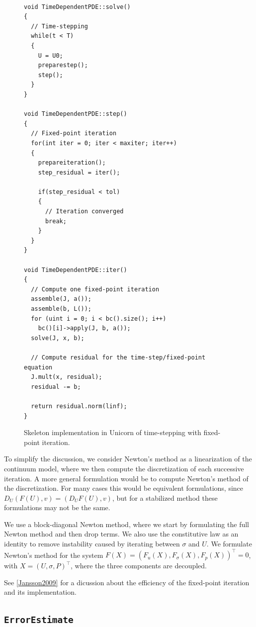 \begin{figure}[!h]
{\small
\begin{lstlisting}

void TimeDependentPDE::solve()
{
  // Time-stepping
  while(t < T)
  {
    U = U0;
    preparestep();
    step();
  }
}

void TimeDependentPDE::step()
{
  // Fixed-point iteration
  for(int iter = 0; iter < maxiter; iter++)
  {
    prepareiteration();
    step_residual = iter();

    if(step_residual < tol)
    {
      // Iteration converged
      break;
    }
  }
}

void TimeDependentPDE::iter()
{
  // Compute one fixed-point iteration
  assemble(J, a());
  assemble(b, L());
  for (uint i = 0; i < bc().size(); i++)
    bc()[i]->apply(J, b, a());
  solve(J, x, b);

  // Compute residual for the time-step/fixed-point equation
  J.mult(x, residual);
  residual -= b;

  return residual.norm(linf);
}
\end{lstlisting}
}
\label{code:time-stepping}
\caption{
Skeleton implementation in Unicorn of time-stepping with fixed-point
iteration.}
\end{figure}

To simplify the discussion, we consider Newton's method as a
linearization of the continuum model, where we then compute the
discretization of each successive iteration. A more general
formulation would be to compute Newton's method of the
discretization. For many cases this would be equivalent formulations,
since $D_U (F(U), v) = (D_U F(U), v)$, but for a stabilized method
these formulations may not be the same.

We use a block-diagonal Newton method, where we start by formulating
the full Newton method and then drop terms. We also use the
constitutive law as an identity to remove instability caused by
iterating between $\sigma$ and $U$. We formulate Newton's method for
the system $F(X) = (F_u(X), F_\sigma(X), F_p(X))^\top = 0$, with $X =
(U, \sigma, P)^\top$, where the three components are decoupled.

See \ref{Jansson2009} for a dicussion about
the efficiency of the fixed-point iteration and its implementation.

\subsection{\tt ErrorEstimate}


